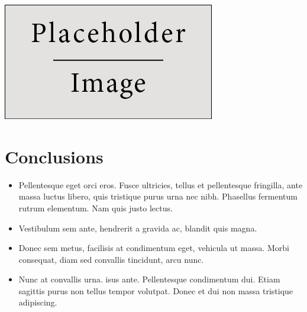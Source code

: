 \documentclass[a0,landscape]{a0poster}
\begin{document}
\begin{multicols}{3}
\begin{center}\vspace{1cm}
\includegraphics[width=0.8\linewidth]{placeholder}
\end{center}\vspace{1cm}


\color{SaddleBrown} %

\section*{Conclusions}

\begin{itemize}
\item Pellentesque eget orci eros. Fusce ultricies, tellus et pellentesque fringilla, ante massa luctus libero, quis tristique purus urna nec nibh. Phasellus fermentum rutrum elementum. Nam quis justo lectus.
\item Vestibulum sem ante, hendrerit a gravida ac, blandit quis magna.
\item Donec sem metus, facilisis at condimentum eget, vehicula ut massa. Morbi consequat, diam sed convallis tincidunt, arcu nunc.
\item Nunc at convallis urna. isus ante. Pellentesque condimentum dui. Etiam sagittis purus non tellus tempor volutpat. Donec et dui non massa tristique adipiscing.
\end{itemize}

\color{DarkSlateGray} %



\end{multicols}
\end{document}
